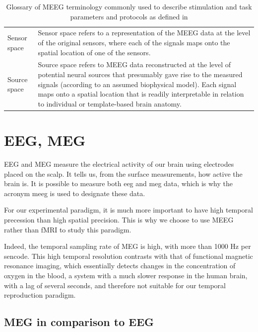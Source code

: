 \begin{table}[ht]
\begin{tabular}{@{}| p{3cm}|p{10cm}| @{}}
        Sensor space & Sensor space refers to a representation of the MEEG data at the level of the original sensors, where each of the signals maps onto the spatial location of one of the sensors.                                                                                                                                           \\
        Source space & Source space refers to MEEG data reconstructed at the level of potential neural sources that presumably gave rise to the measured signals (according to an assumed biophysical model). Each signal maps onto a spatial location that is readily interpretable in relation to individual or template-based brain anatomy. \\
        \hline
    \end{tabular}
    \caption{Glossary of MEEG terminology commonly used to describe stimulation and task parameters and protocols as defined in \cite{pernet2018best}}

    \label{Tab:Glossary_protocol}
\end{table}



\section{EEG, MEG}

EEG and MEG measure the electrical activity of our brain using electrodes placed on the scalp. It tells us, from the surface measurements, how active the brain is. It is possible to measure both eeg and meg data, which is why the acronym meeg is used to designate these data.

For our experimental paradigm, it is much more important to have high temporal precession than high spatial precision. This is why we choose to use MEEG rather than fMRI to study this paradigm.

Indeed, the temporal sampling rate of MEG is high, with more than 1000 Hz per sencode. This high temporal resolution contrasts with that of functional magnetic resonance imaging, which essentially detects changes in the concentration of oxygen in the blood, a system with a much slower response in the human brain, with a lag of several seconds, and therefore not suitable for our temporal reproduction paradigm.


\subsection{MEG in comparison to EEG}

